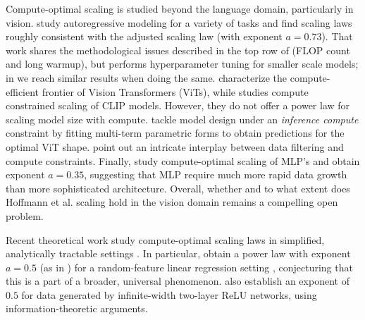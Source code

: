 \documentclass{article}
\makeatletter
\theoremstyle{plain}
\theoremstyle{definition}
\theoremstyle{remark}
\newcommand{\Hoffmann}{Hoffmann et al.\@\xspace}
\newcommand{\nExp}{a}
\makeatother
\begin{document}
{Compute-optimal scaling is studied beyond the language domain, particularly in vision. \citet{henighan2020scaling} study autoregressive modeling for a variety of tasks and find scaling laws roughly consistent with the \citet{kaplan2020scaling} adjusted scaling law (with exponent $\nExp=0.73$). That work shares the methodological issues described in the top row of  (FLOP count and long warmup), but performs hyperparameter tuning for smaller scale models; in  we reach similar results when doing the same. \citet{zhai2022scaling} characterize the compute-efficient frontier of Vision Transformers (ViTs), while \citet{cherti2023reproducible} studies compute constrained scaling of CLIP models. However, they do not offer a power law for scaling model size with compute. \citet{alabdulmohsin2023getting} tackle model design under an \emph{inference compute} constraint by fitting multi-term parametric forms to obtain predictions for the optimal ViT shape. 
\citet{goyal2024scaling} point out an intricate interplay between data filtering and compute constraints. Finally, \citet{bachmann2024scaling} study compute-optimal scaling of MLP's and obtain exponent $\nExp=\num{0.35}$, suggesting that MLP require much more rapid data growth than more sophisticated architecture. Overall, whether and to what extent does \Hoffmann scaling hold in the vision domain remains a compelling open problem.  

Recent theoretical work study compute-optimal scaling laws in simplified, analytically tractable settings \cite{bordelon2024dynamical,lin2024scaling,paquette2024four,jeon2024information}. In particular, \citet{paquette2024four} obtain a power law with exponent $a=0.5$ (as in \citet{hoffmann2022empirical}) for a random-feature linear regression setting \cite{maloney2022solvable,atanaso2023onset}, conjecturing that this is a part of a broader, universal phenomenon. \citet{jeon2024information} also establish an exponent of $0.5$  for data generated by infinite-width two-layer ReLU networks, using information-theoretic arguments. 

}
\end{document}
